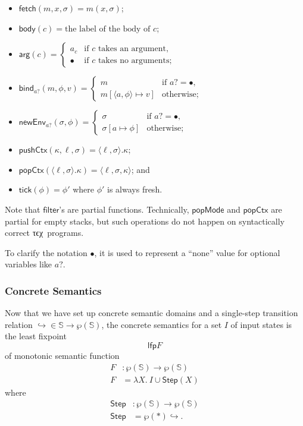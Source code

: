 \documentclass[a4paper]{article}
\newcommand*{\tex}{τϵχ}
\newcommand*{\power}[1]{\wp(#1)}
\newcommand*{\dom}[1]{\mathbb{#1}}
\newcommand*{\lfp}{\mathsf{lfp}}
\newcommand*{\Step}{\mathsf{Step}}
\newcommand*{\body}{\mathsf{body}}
\newcommand*{\Arg}{\mathsf{arg}}
\newcommand*{\tarrow}{\hookrightarrow}
\newcommand*{\fetch}{\mathsf{fetch}}
\newcommand*{\filter}{\mathsf{filter}}
\newcommand*{\popMode}{\mathsf{popMode}}
\newcommand*{\bind}{\mathsf{bind}}
\newcommand*{\newEnv}{\mathsf{newEnv}}
\newcommand*{\pushCtx}{\mathsf{pushCtx}}
\newcommand*{\popCtx}{\mathsf{popCtx}}
\newcommand*{\tick}{\mathsf{tick}}
\begin{document}
\begin{itemize}
\item $\fetch(m, x, \sigma) = m(x, \sigma)$;
\item $\body(c) = \text{the label of the body of $c$}$;
\item $\Arg(c) =
  \begin{cases}
    a_c &\text{if $c$ takes an argument,}\\
    \bullet &\text{if $c$ takes no arguments;}
  \end{cases}$
\item $\bind_{a?}(m, \phi, v) =
  \begin{cases}
    m &\text{if $a? = \bullet$,}\\
    m[\langle a, \phi \rangle \mapsto v] &\text{otherwise;}
  \end{cases}$
\item $\newEnv_{a?}(\sigma, \phi) =
  \begin{cases}
    \sigma &\text{if $a? = \bullet$,}\\
    \sigma[a \mapsto \phi] &\text{otherwise;}
  \end{cases}$
\item $\pushCtx(\kappa, \ell, \sigma) = \langle \ell, \sigma\rangle.\kappa$;
\item $\popCtx(\langle\ell, \sigma\rangle.\kappa) = \langle \ell, \sigma, \kappa \rangle$; and
\item $\tick(\phi) = \phi'$ where $\phi'$ is always fresh.
\end{itemize}
Note that $\filter$'s are partial functions.
Technically, $\popMode$ and $\popCtx$ are partial for empty stacks, but such operations do not happen on syntactically correct \tex\ programs.

To clarify the notation $\bullet$, it is used to represent a ``none'' value for optional variables like $a?$.

\subsubsection{Concrete Semantics}
Now that we have set up concrete semantic domains and a single-step transition relation ${\tarrow} \in \dom S \to \power{\dom S}$, the concrete semantics for a set $I$ of input states is the least fixpoint \[\lfp F\] of monotonic semantic function
\begin{align*}
  F &: \power{\dom{S}} \to \power{\dom{S}} \\
  F &= \lambda X.\ I \cup \Step(X)
\end{align*}
where
\begin{align*}
  \Step &: \power{\dom{S}} \to \power{\dom{S}} \\
  \Step &= \power*{\tarrow}.
\end{align*}
\end{document}
